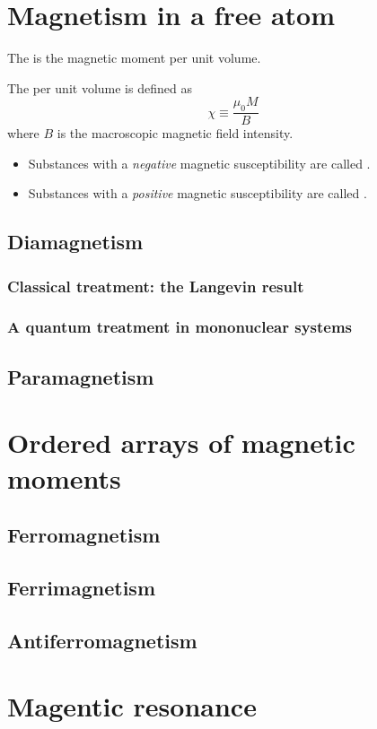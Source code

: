 \section{Magnetism in a free atom}
The  is the magnetic moment per unit volume.

The  per unit volume is defined as
\[ \chi \equiv \frac{\mu_0 M}{B} \]
where $B$ is the macroscopic magnetic field intensity.
\begin{itemize}
\item Substances with a \textit{negative} magnetic susceptibility are called .
\item Substances with a \textit{positive} magnetic susceptibility are called .
\end{itemize}
\subsection{Diamagnetism}
\subsubsection{Classical treatment: the Langevin result}
\subsubsection{A quantum treatment in mononuclear systems}
\subsection{Paramagnetism}

\section{Ordered arrays of magnetic moments}
\subsection{Ferromagnetism}
\subsection{Ferrimagnetism}
\subsection{Antiferromagnetism}
\section{Magentic resonance}



